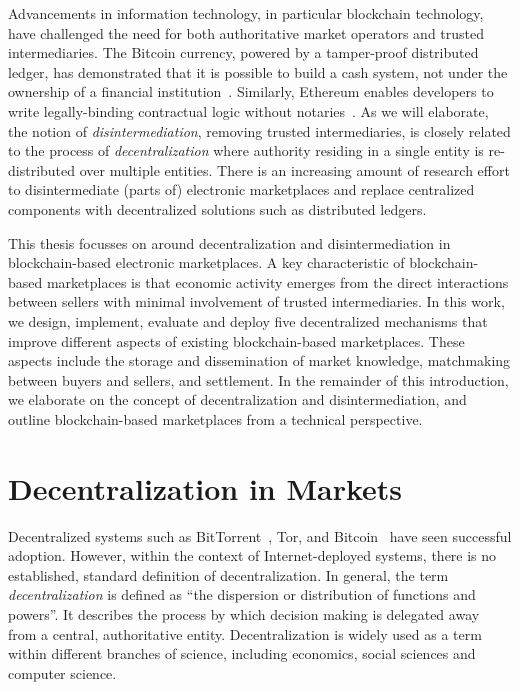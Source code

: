 Advancements in information technology, in particular blockchain technology, have challenged the need for both authoritative market operators and trusted intermediaries.
The Bitcoin currency, powered by a tamper-proof distributed ledger, has demonstrated that it is possible to build a cash system, not under the ownership of a financial institution~\cite{nakamoto2008bitcoin}.
Similarly, Ethereum enables developers to write legally-binding contractual logic without notaries~\cite{wood2014ethereum}.
As we will elaborate, the notion of \emph{disintermediation}, removing trusted intermediaries, is closely related to the process of \emph{decentralization} where authority residing in a single entity is re-distributed over multiple entities.
There is an increasing amount of research effort to disintermediate (parts of) electronic marketplaces and replace centralized components with decentralized solutions such as distributed ledgers.

This thesis focusses on around decentralization and disintermediation in blockchain-based electronic marketplaces.
A key characteristic of blockchain-based marketplaces is that economic activity emerges from the direct interactions between sellers with minimal involvement of trusted intermediaries.
In this work, we design, implement, evaluate and deploy five decentralized mechanisms that improve different aspects of existing blockchain-based marketplaces.
These aspects include the storage and dissemination of market knowledge, matchmaking between buyers and sellers, and settlement.
In the remainder of this introduction, we elaborate on the concept of decentralization and disintermediation, and outline blockchain-based marketplaces from a technical perspective.

\section{Decentralization in Markets}
\label{sec:decentralization}
Decentralized systems such as BitTorrent~\cite{pouwelse2005bittorrent}, Tor, and Bitcoin~\cite{nakamoto2008bitcoin} have seen successful adoption.
However, within the context of Internet-deployed systems, there is no established, standard definition of decentralization.
In general, the term \emph{decentralization} is defined as \enquote{the dispersion or distribution of functions and powers}.
It describes the process by which decision making is delegated away from a central, authoritative entity.
Decentralization is widely used as a term within different branches of science, including economics, social sciences and computer science.

